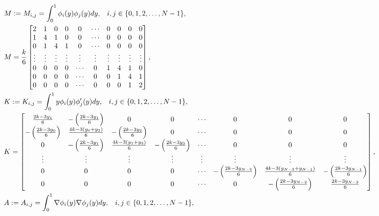 \documentclass{article}
\begin{document}
\begin{align*}
& M : = M_{i, j}= \int_0^1  \phi_i(y) \phi_j(y) dy,\;\;\; i,j \in \{0, 1, 2, \dots, N-1 \},\\
&M =
\frac{k}{6}\begin{bmatrix}
2 & 1 & 0 & 0 &0&  \cdots&0 &0  & 0&0 \\
1& 4 & 1 & 0 &0& \cdots &0 &0 & 0&0\\
0&1&4 & 1 & 0 & \cdots &0 &0 &0&0\\
\vdots&\vdots&\vdots &\vdots &  \vdots & \vdots&\vdots&\vdots&\vdots&\vdots\\
0&0&0&0&\cdots&0 & 1 & 4 & 1 &0 \\
0&0&0&0&\cdots&0 & 0 & 1 &4&1 \\
0&0&0&0&\cdots &0& 0 & 0 &1&2 \\
\end{bmatrix},\\
& K: = K_{i, j}= \int_0^1 y \phi_i(y) \phi_j^{\prime}(y) dy,\;\;\; i,j \in \{0, 1, 2, \dots, N-1 \},\\
& K = 
\begin{bmatrix}
\frac{2k- 3y_1}{6} & -\left( \frac{2k- 3y_1}{6} \right)& 0 &0&  \cdots&0 &0  & 0\\
-\left( \frac{2k- 3y_0}{6} \right)&\frac{4k - 3(y_0 + y_2)}{6} &-\left( \frac{2k- 3y_2}{6}\right)  &0& \cdots &0 &0 & 0\\
0&-\left( \frac{2k- 3y_1}{6} \right)&\frac{4k - 3(y_1 + y_3)}{6} &-\left( \frac{2k- 3y_3}{6}\right) & \cdots &0 &0 &0\\
\vdots&\vdots&\vdots &\vdots &  \vdots & \vdots&\vdots&\vdots\\
0&0&0&0&\cdots&-\left( \frac{2k- 3y_{N-3}}{6}\right)& \frac{4k - 3(y_{N-3} + y_{N-1})}{6} &-\left( \frac{2k- 3y_{N-1}}{6}\right) \\
0&0&0&0&\cdots &0 &-\left( \frac{2k- 3y_{N-2}}{6}\right)&\frac{2k - 3y_{N-2}}{6} \\
\end{bmatrix},\\
\vspace{2cm}
& A := A_{i, j}= \int_0^1 \nabla \phi_i(y) \nabla \phi_j(y) dy,\;\;\; i,j \in \{0, 1, 2, \dots, N-1 \},\\

\end{align*}
\end{document}
